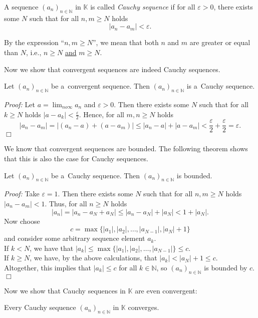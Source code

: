 

\begin{Definition}
A sequence $(a_n)_{n\in\mathbb{N}}$ in $\mathbb{K}$ is called \textit{Cauchy sequence} if for all $\varepsilon>0$, there exists some $N$ such that for all $n,m\geq N$ holds
\[|a_n-a_m|<\varepsilon.\]
\end{Definition}
\begin{Remark}{}
By the expression ``$n,m\geq N$'', we mean that both $n$ and $m$ are greater or equal than $N$, i.e., $n\geq N$ \underline{and} $m\geq N$.
\end{Remark}

Now we show that convergent sequences are indeed Cauchy sequences.
\begin{Theorem}{}\label{thm:convcauch}
    Let $(a_n)_{n\in\mathbb{N}}$ be a~convergent sequence. Then $(a_n)_{n\in\mathbb{N}}$ is a~Cauchy sequence.
\end{Theorem}
{\em Proof:}
Let $a=\lim_{n	o\infty}a_{n}$ and $\varepsilon>0$. Then there exists some $N$ such that for all $k\geq N$ holds $|a-a_k|<\frac{\varepsilon}2$. Hence, for all $m,n\geq N$ holds
\[|a_n-a_m|=|(a_n-a)+(a-a_m)|\leq|a_n-a|+|a-a_m|< \frac{\varepsilon}2+\frac{\varepsilon}2=\varepsilon.\]
$\Box$

We know that convergent sequences are bounded.
The following theorem shows that this is also the case for Cauchy sequences. 
\begin{Theorem}\label{thm:cauchseqbnd}
    Let $(a_n)_{n\in\mathbb{N}}$ be a~Cauchy sequence. Then $(a_n)_{n\in\mathbb{N}}$ is bounded.
\end{Theorem}
{\em Proof:} Take $\varepsilon=1$. Then there exists some $N$ such that for all $n,m\geq N$ holds $|a_n-a_m|<1$. Thus, for all $n\geq N$ holds
\[|a_n|=|a_n-a_N+a_N|\leq |a_n-a_N|+|a_N|<1+|a_N|.\]
Now choose
\[c=\max\{|a_1|,|a_2|,\ldots,|a_{N-1}|,|a_N|+1\}\]
and consider some arbitrary sequence element $a_k$.\\
If $k<N$, we have that $|a_k|\leq \max\{|a_1|,|a_2|,\ldots,|a_{N-1}|\}\leq c$.\\
If $k\geq N$, we have, by the above calculations, that $|a_k|<|a_N|+1\leq c$.\\
Altogether, this implies that $|a_k|\leq c$ for all $k\in\mathbb{N}$, so $(a_n)_{n\in\mathbb{N}}$ is bounded by $c$.\hfill$\Box$

Now we show that Cauchy sequences in $\mathbb{K}$ are even convergent:
\begin{Theorem}{}\label{thm:Rcompl}
Every Cauchy sequence $(a_n)_{n\in\mathbb{N}}$ in $\mathbb{K}$ converges.
\end{Theorem}

